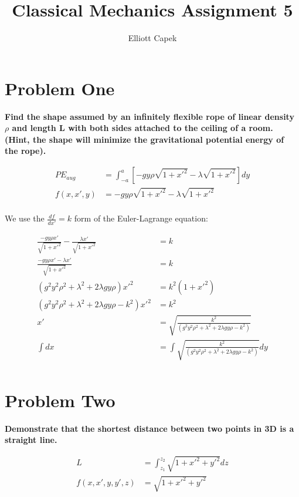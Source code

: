 \documentclass[10pt]{article} %
\title{Classical Mechanics Assignment 5}
\author{Elliott Capek}
\begin{document}
\maketitle{}

\section{Problem One}
\textbf{Find the shape assumed by an infinitely flexible rope of linear density $\rho$ and length L with both sides attached to the ceiling of a room. (Hint, the shape will minimize the gravitational potential energy of the rope).}

\begin{align*}
  PE_{aug} &= \int_{-a}^{a} \left[-gy\rho \sqrt{1 + x'^2} - \lambda\sqrt{1+x'^2}\right]dy\\
  f(x,x',y) &= -gy\rho \sqrt{1 + x'^2} - \lambda\sqrt{1+x'^2}\\
\end{align*}

We use the $\frac{df}{dx'} = k$ form of the Euler-Lagrange equation:

\begin{align*}
  \frac{-gy\rho x'}{\sqrt{1 + x'^2}} - \frac{\lambda x'}{\sqrt{1+x'^2}} &= k\\
  \frac{-gy\rho x' - \lambda x'}{\sqrt{1 + x'^2}} &= k\\
  \left(g^2y^2\rho^2 + \lambda^2 + 2\lambda gy\rho\right)x'^2 &= k^2\left(1 + x'^2\right)\\
  \left(g^2y^2\rho^2 + \lambda^2 + 2\lambda gy\rho -k^2\right)x'^2 &= k^2\\
  x' &= \sqrt{\frac{k^2}{\left(g^2y^2\rho^2 + \lambda^2 + 2\lambda gy\rho -k^2\right)}}\\
  \int dx &= \int \sqrt{\frac{k^2}{\left(g^2y^2\rho^2 + \lambda^2 + 2\lambda gy\rho -k^2\right)}}dy\\
\end{align*}

\section{Problem Two}
\textbf{Demonstrate that the shortest distance between two points in 3D is a straight line.}

\begin{align*}
  L &= \int_{z_1}^{z_2} \sqrt{1 + x'^2 + y'^2} dz\\
  f(x, x', y, y', z) &= \sqrt{1 + x'^2 + y'^2}\\
\end{align*}
\end{document}
